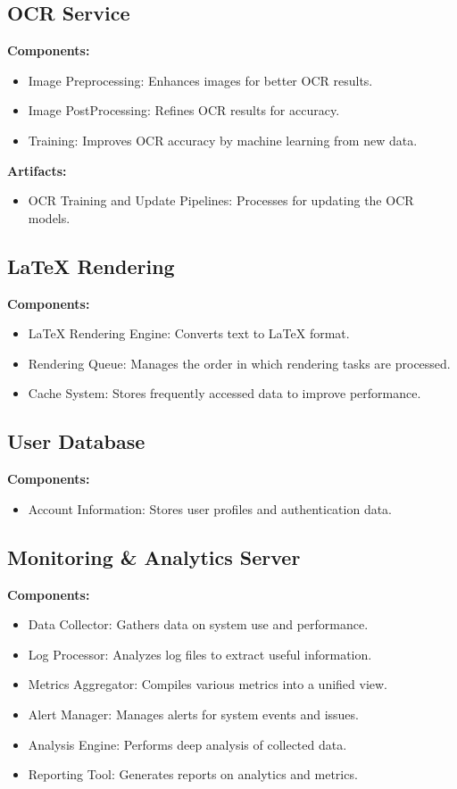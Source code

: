 \documentclass{article}
\begin{document}
\subsection{OCR Service}
\textbf{Components:}
\begin{itemize}
    \item Image Preprocessing: Enhances images for better OCR results.
    \item Image PostProcessing: Refines OCR results for accuracy.
    \item Training: Improves OCR accuracy by machine learning from new data.
\end{itemize}
\textbf{Artifacts:}
\begin{itemize}
    \item OCR Training and Update Pipelines: Processes for updating the OCR models.
\end{itemize}

\subsection{LaTeX Rendering}
\textbf{Components:}
\begin{itemize}
    \item LaTeX Rendering Engine: Converts text to LaTeX format.
    \item Rendering Queue: Manages the order in which rendering tasks are processed.
    \item Cache System: Stores frequently accessed data to improve performance.
\end{itemize}

\subsection{User Database}
\textbf{Components:}
\begin{itemize}
    \item Account Information: Stores user profiles and authentication data.
\end{itemize}

\subsection{Monitoring \& Analytics Server}
\textbf{Components:}
\begin{itemize}
    \item Data Collector: Gathers data on system use and performance.
    \item Log Processor: Analyzes log files to extract useful information.
    \item Metrics Aggregator: Compiles various metrics into a unified view.
    \item Alert Manager: Manages alerts for system events and issues.
    \item Analysis Engine: Performs deep analysis of collected data.
    \item Reporting Tool: Generates reports on analytics and metrics.
\end{itemize}
\end{document}
